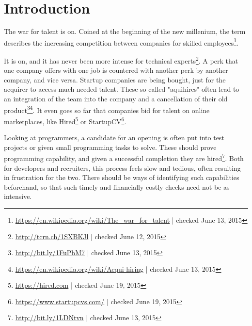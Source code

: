\chapter{Introduction}\label{ch:introduction}
The war for talent is on. Coined at the beginning of the new
millenium, the term describes the increasing competition between companies
for skilled employees\footnote{\url{https://en.wikipedia.org/wiki/The_war_for_talent} | checked June 13, 2015}.

It is on, and it has never been more intense for technical experts\footnote{\url{http://tcrn.ch/1SXBKJl} | checked June 12, 2015}.
A perk that one company offers with one job is countered with another perk by
another company, and vice versa. Startup companies are being bought,
just for the acquirer to access much needed talent.
These so called "aquihires" often lead to an integration of the team into
the company and a cancellation of their old product\footnote{\url{http://bit.ly/1FuPbM7} | checked June 13, 2015}\footnote{\url{https://en.wikipedia.org/wiki/Acqui-hiring} | checked June 13, 2015}.
It even goes so far that companies bid for talent on online marketplaces, like
Hired\footnote{\url{https://hired.com} | checked June 19, 2015} or StartupCV\footnote{\url{https://www.startupcvs.com/} | checked June 19, 2015}.
\newline

Looking at programmers, a candidate for an opening is often put into
test projects or given small programming tasks to solve.
These should prove programming capability, and given a successful completion
they are hired\footnote{\url{http://bit.ly/1LDNtvn} | checked June 13, 2015}.
Both for developers and recruiters, this process feels slow and tedious,
often resulting in frustration for the two. There should be ways of
identifying such capabilities beforehand, so that such timely and financially
costly checks need not be as intensive.

